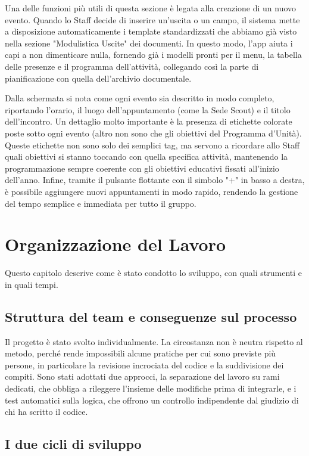 \documentclass[11pt]{article}
\numberwithin{figure}{section}
\begin{document}
Una delle funzioni più utili di questa sezione è legata alla creazione di un nuovo evento. Quando lo Staff decide di inserire un'uscita o un campo, il sistema mette a disposizione automaticamente i template standardizzati che abbiamo già visto nella sezione "Modulistica Uscite" dei documenti. In questo modo, l'app aiuta i capi a non dimenticare nulla, fornendo già i modelli pronti per il menu, la tabella delle presenze e il programma dell'attività, collegando così la parte di pianificazione con quella dell'archivio documentale.

Dalla schermata si nota come ogni evento sia descritto in modo completo, riportando l'orario, il luogo dell'appuntamento (come la Sede Scout) e il titolo dell'incontro. Un dettaglio molto importante è la presenza di etichette colorate poste sotto ogni evento (altro non sono che gli obiettivi del Programma d'Unità). Queste etichette non sono solo dei semplici tag, ma servono a ricordare allo Staff quali obiettivi si stanno toccando con quella specifica attività, mantenendo la programmazione sempre coerente con gli obiettivi educativi fissati all'inizio dell'anno. Infine, tramite il pulsante flottante con il simbolo "+" in basso a destra, è possibile aggiungere nuovi appuntamenti in modo rapido, rendendo la gestione del tempo semplice e immediata per tutto il gruppo.

\section{Organizzazione del Lavoro}

Questo capitolo descrive come è stato condotto lo sviluppo, con quali strumenti e in quali tempi.

\subsection{Struttura del team e conseguenze sul processo}

Il progetto è stato svolto individualmente. La circostanza non è neutra rispetto al metodo, perché rende impossibili alcune pratiche per cui sono previste più persone, in particolare la revisione incrociata del codice e la suddivisione dei compiti. Sono stati adottati due approcci, la separazione del lavoro su rami dedicati, che obbliga a rileggere l'insieme delle modifiche prima di integrarle, e i test automatici sulla logica, che offrono un controllo indipendente dal giudizio di chi ha scritto il codice.

\subsection{I due cicli di sviluppo}
\end{document}
